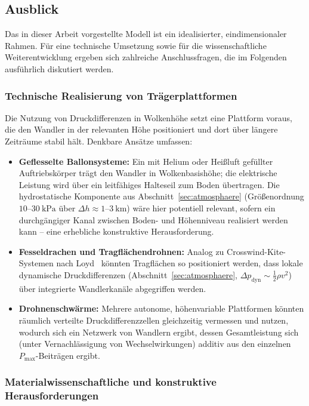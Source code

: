 ﻿\documentclass[a4paper,12pt]{article}
\theoremstyle{definition}
\begin{document}
\subsection{Ausblick}
\label{sec:ausblick}

Das in dieser Arbeit vorgestellte Modell ist ein idealisierter,
eindimensionaler Rahmen. Für eine technische Umsetzung sowie für die
wissenschaftliche Weiterentwicklung ergeben sich zahlreiche
Anschlussfragen, die im Folgenden ausführlich diskutiert werden.

\subsubsection{Technische Realisierung von Trägerplattformen}

Die Nutzung von Druckdifferenzen in Wolkenhöhe setzt eine Plattform
voraus, die den Wandler in der relevanten Höhe positioniert und dort
über längere Zeiträume stabil hält. Denkbare Ansätze umfassen:

\begin{itemize}
	\item \textbf{Geflesselte Ballonsysteme:} Ein mit Helium oder
	Heißluft gefüllter Auftriebskörper trägt den Wandler in
	Wolkenbasishöhe; die elektrische Leistung wird über ein
	leitfähiges Halteseil zum Boden übertragen. Die hydrostatische
	Komponente aus Abschnitt~\ref{sec:atmosphaere} (Größenordnung
	$10$--$30\ \mathrm{kPa}$ über $\Delta h \approx 1$--$3\ \mathrm{km}$)
	wäre hier potentiell relevant, sofern ein durchgängiger Kanal
	zwischen Boden- und Höhenniveau realisiert werden kann -- eine
	erhebliche konstruktive Herausforderung.
	\item \textbf{Fesseldrachen und Tragflächendrohnen:} Analog zu
	Crosswind-Kite-Systemen nach Loyd~\cite{loyd1980} könnten
	Tragflächen so positioniert werden, dass lokale dynamische
	Druckdifferenzen (Abschnitt~\ref{sec:atmosphaere},
	$\Delta p_{\mathrm{dyn}} \sim \tfrac{1}{2}\rho v^2$) über
	integrierte Wandlerkanäle abgegriffen werden.
	\item \textbf{Drohnenschwärme:} Mehrere autonome, höhenvariable
	Plattformen könnten räumlich verteilte Druckdifferenzzellen
	gleichzeitig vermessen und nutzen, wodurch sich ein Netzwerk von
	Wandlern ergibt, dessen Gesamtleistung sich (unter
	Vernachlässigung von Wechselwirkungen) additiv aus den einzelnen
	$P_{\max}$-Beiträgen ergibt.
\end{itemize}

\subsubsection{Materialwissenschaftliche und konstruktive Herausforderungen}
\end{document}
